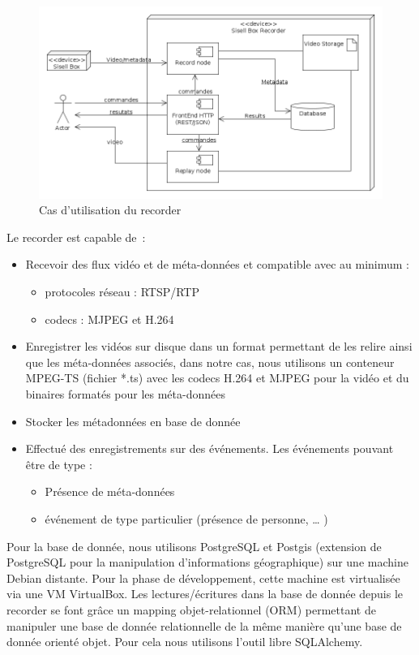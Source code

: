 \begin{figure}[!h]
  \centering
  \includegraphics[scale=0.5]{figures/sisell_box_recorder}
  \caption{Cas d'utilisation du recorder}
\end{figure}

Le recorder est capable de :
\begin{itemize}
\item Recevoir des flux vidéo et de méta-données et compatible avec au minimum :
    \begin{itemize}[label=$\bullet$]
      \item  protocoles réseau : RTSP/RTP
      \item  codecs : MJPEG et H.264
    \end{itemize}
\item Enregistrer les vidéos sur disque dans un format permettant de les relire ainsi que les méta-données associés, dans notre cas, nous utilisons un conteneur MPEG-TS (fichier *.ts) avec les codecs H.264 et MJPEG pour la vidéo et du binaires formatés pour les méta-données
\item Stocker les métadonnées en base de donnée
\item Effectué des enregistrements sur des événements. Les événements pouvant être de type :
  \begin{itemize}[label=$\bullet$]
      \item Présence de méta-données
      \item  événement de type particulier (présence de personne, … )\\
  \end{itemize}
\end{itemize}

Pour la base de donnée, nous utilisons PostgreSQL et Postgis (extension de PostgreSQL pour la manipulation d'informations géographique) sur une machine Debian distante. Pour la phase de développement, cette machine est virtualisée via une VM VirtualBox.
Les lectures/écritures dans la base de donnée depuis le recorder se font grâce un mapping objet-relationnel (ORM) permettant de manipuler une base de donnée relationnelle de la même manière qu'une base de donnée orienté objet. Pour cela nous utilisons l'outil libre SQLAlchemy.


